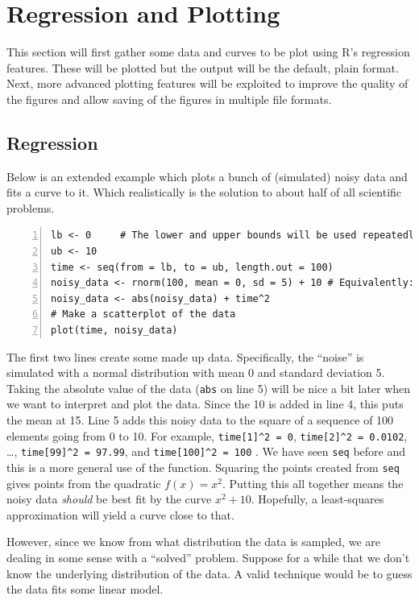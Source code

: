 \documentclass[12pt]{article}
\theoremstyle{remark}
\begin{document}
\section{Regression and Plotting}

This section will first gather some data and curves to be plot using R's regression features. These will be plotted but the output will be the default, plain format. Next, more advanced plotting features will be exploited to improve the quality of the figures and allow saving of the figures in multiple file formats.

\subsection{Regression}
Below is an extended example which plots a bunch of (simulated) noisy data and fits a curve to it. Which realistically is the solution to about half of all scientific problems.

\begin{Verbatim}[frame=single, fontsize=\small, numbers=left]
lb <- 0     # The lower and upper bounds will be used repeatedly
ub <- 10
time <- seq(from = lb, to = ub, length.out = 100)
noisy_data <- rnorm(100, mean = 0, sd = 5) + 10 # Equivalently: rnorm(100,10,5)
noisy_data <- abs(noisy_data) + time^2
# Make a scatterplot of the data
plot(time, noisy_data)
\end{Verbatim}

The first two lines create some made up data. Specifically, the ``noise'' is simulated with a normal distribution with mean 0 and standard deviation 5. Taking the absolute value of the data (\verb|abs| on line 5) will be nice a bit later when we want to interpret and plot the data. Since the 10 is added in line 4, this puts the mean at 15. Line 5 adds this noisy data to the square of a sequence of 100 elements going from 0 to 10. For example, \verb|time[1]^2 = 0|, \verb|time[2]^2 = 0.0102|, \dots, \verb|time[99]^2 = 97.99|, and \verb|time[100]^2 = 100| . We have seen \verb|seq| before and this is a more general use of the function. Squaring the points created from \verb|seq| gives points from the quadratic $f(x) = x^2$. Putting this all together means the noisy data \emph{should} be best fit by the curve $x^2 + 10$. Hopefully, a least-squares approximation will yield a curve close to that.

However, since we know from what distribution the data is sampled, we are dealing in some sense with a ``solved'' problem. Suppose for a while that we don't know the underlying distribution of the data. A valid technique would be to guess the data fits some linear model.
\end{document}
